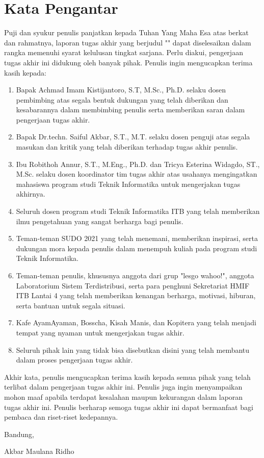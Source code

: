 \chapter*{Kata Pengantar}

Puji dan syukur penulis panjatkan kepada Tuhan Yang Maha Esa atas berkat dan rahmatnya, laporan tugas akhir yang berjudul "\thetitle" dapat diselesaikan dalam rangka memenuhi syarat kelulusan tingkat sarjana. Perlu diakui, pengerjaan tugas akhir ini didukung oleh banyak pihak. Penulis ingin mengucapkan terima kasih kepada:

\begin{enumerate}
  \item Bapak Achmad Imam Kistijantoro, S.T, M.Sc., Ph.D. selaku dosen pembimbing atas segala bentuk dukungan yang telah diberikan dan kesabarannya dalam membimbing penulis serta memberikan saran dalam pengerjaan tugas akhir.
  \item Bapak Dr.techn. Saiful Akbar, S.T., M.T. selaku dosen penguji atas segala masukan dan kritik yang telah diberikan terhadap tugas akhir penulis.
  \item Ibu Robithoh Annur, S.T., M.Eng., Ph.D. dan Tricya Esterina Widagdo, ST., M.Sc. selaku dosen koordinator tim tugas akhir atas usahanya mengingatkan mahasiswa program studi Teknik Informatika untuk mengerjakan tugas akhirnya.
  \item Seluruh dosen program studi Teknik Informatika ITB yang telah memberikan ilmu pengetahuan yang sangat berharga bagi penulis.
  \item Teman-teman SUDO 2021 yang telah menemani, memberikan inspirasi, serta dukungan mora kepada penulis dalam menempuh kuliah pada program studi Teknik Informatika.
  \item Teman-teman penulis, khususnya anggota dari grup "lesgo wahoo!", anggota Laboratorium Sistem Terdistribusi, serta para penghuni Sekretariat HMIF ITB Lantai 4 yang telah memberikan kenangan berharga, motivasi, hiburan, serta bantuan untuk segala situasi.
  \item Kafe AyamAyaman, Bosscha, Kisah Manis, dan Kopitera yang telah menjadi tempat yang nyaman untuk mengerjakan tugas akhir.
  \item Seluruh pihak lain yang tidak bisa disebutkan disini yang telah membantu dalam proses pengerjaan tugas akhir.
\end{enumerate}

Akhir kata, penulis mengucapkan terima kasih kepada semua pihak yang telah terlibat dalam pengerjaan tugas akhir ini. Penulis juga ingin menyampaikan mohon maaf apabila terdapat kesalahan maupun kekurangan dalam laporan tugas akhir ini. Penulis berharap semoga tugas akhir ini dapat bermanfaat bagi pembaca dan riset-riset kedepannya.

\begin{flushright}
  \vspace{0.5cm}
  Bandung, \tanggalpengesahan


  \vspace{1.5cm}

  Akbar Maulana Ridho
\end{flushright}